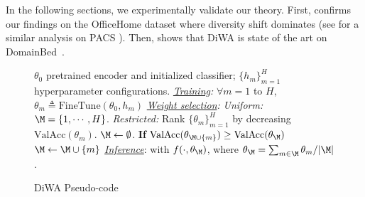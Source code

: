 In the following sections, we experimentally validate our theory.
First,  confirms our findings on the OfficeHome dataset \cite{venkateswara2017deep} where diversity shift dominates \cite{ye2021odbench} (see  for a similar analysis on PACS \cite{li2017deeper}). Then,  shows that DiWA is state of the art on DomainBed~\cite{gulrajani2021in}.%
\begin{figure}
    \vskip -0.1in
    \begin{algorithm}[H]
        \caption{DiWA Pseudo-code} \label{alg:pseudo-code}
        \begin{algorithmic}
            \REQUIRE $\theta_0$ pretrained encoder and initialized classifier; $\{h_m\}_{m=1}^H$ hyperparameter configurations.
            \STATE \hspace*{-1.25em} \textit{\underline{Training}:} $\forall m=1$ to $H$, $\theta_m \triangleq \mathrm{FineTune}(\theta_0, h_m)$
            \STATE \hspace*{-1.25em} \textit{\underline{Weight selection}:}
            \STATE \hspace*{-0.5em} \textit{Uniform:} $\M=\{1, \cdots, H\}$.
            \STATE \hspace*{-0.5em} \textit{Restricted:} Rank $\{\theta_m\}_{m=1}^H$ by decreasing $\mathrm{ValAcc}(\theta_m)$. $\M\leftarrow\emptyset$.
            \STATE \textbf{If} $\mathrm{ValAcc}(\theta_{\M \cup \{m\}})\geq\mathrm{ValAcc}(\theta_\M)$
            \STATE $\M \leftarrow \M\cup \{m\}$
            \ENDFOR
            \STATE \hspace*{-1.25em} \textit{\underline{Inference}}: with $f(\cdot, \theta_\M)$, where $\theta_\M=\sum_{m\in\M}\theta_m/|\M|$.
        \end{algorithmic}
    \end{algorithm}
    \vskip -0.3in
\end{figure}%